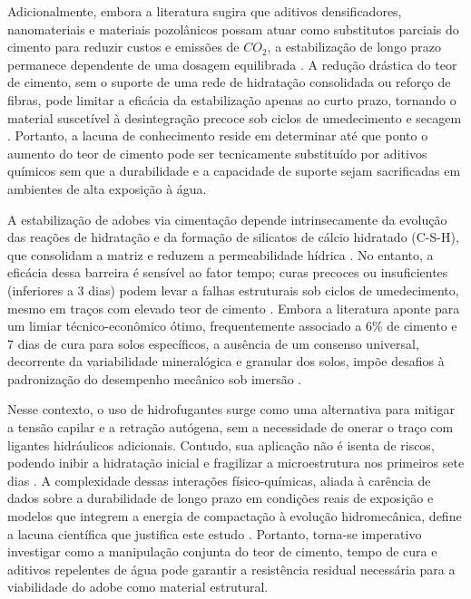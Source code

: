     Adicionalmente, embora a literatura sugira que aditivos densificadores, nanomateriais e materiais pozolânicos possam atuar como substitutos parciais do cimento para reduzir custos e emissões de $CO_2$, a estabilização de longo prazo permanece dependente de uma dosagem equilibrada \cite{Zhang2025, Jahandari2023, Dormohamadi2024, Wahabi2021}. A redução drástica do teor de cimento, sem o suporte de uma rede de hidratação consolidada ou reforço de fibras, pode limitar a eficácia da estabilização apenas ao curto prazo, tornando o material suscetível à desintegração precoce sob ciclos de umedecimento e secagem \cite{Wahabi2021}. Portanto, a lacuna de conhecimento reside em determinar até que ponto o aumento do teor de cimento pode ser tecnicamente substituído por aditivos químicos sem que a durabilidade e a capacidade de suporte sejam sacrificadas em ambientes de alta exposição à água.


    A estabilização de adobes via cimentação depende intrinsecamente da evolução das reações de hidratação e da formação de silicatos de cálcio hidratado (C-S-H), que consolidam a matriz e reduzem a permeabilidade hídrica \cite{Dao2018}. No entanto, a eficácia dessa barreira é sensível ao fator tempo; curas precoces ou insuficientes (inferiores a 3 dias) podem levar a falhas estruturais sob ciclos de umedecimento, mesmo em traços com elevado teor de cimento \cite{Wahabi2021, Nshimiyimana2020, Yang2024}. Embora a literatura aponte para um limiar técnico-econômico ótimo, frequentemente associado a 6\% de cimento e 7 dias de cura para solos específicos, a ausência de um consenso universal, decorrente da variabilidade mineralógica e granular dos solos, impõe desafios à padronização do desempenho mecânico sob imersão \cite{Abdallah2023, Wahabi2021}.

    Nesse contexto, o uso de hidrofugantes surge como uma alternativa para mitigar a tensão capilar e a retração autógena, sem a necessidade de onerar o traço com ligantes hidráulicos adicionais. Contudo, sua aplicação não é isenta de riscos, podendo inibir a hidratação inicial e fragilizar a microestrutura nos primeiros sete dias \cite{Lu2023}. A complexidade dessas interações físico-químicas, aliada à carência de dados sobre a durabilidade de longo prazo em condições reais de exposição e modelos que integrem a energia de compactação à evolução hidromecânica, define a lacuna científica que justifica este estudo \cite{Abdallah2023, Jahandari2023, Rosicki2022}. Portanto, torna-se imperativo investigar como a manipulação conjunta do teor de cimento, tempo de cura e aditivos repelentes de água pode garantir a resistência residual necessária para a viabilidade do adobe como material estrutural.

